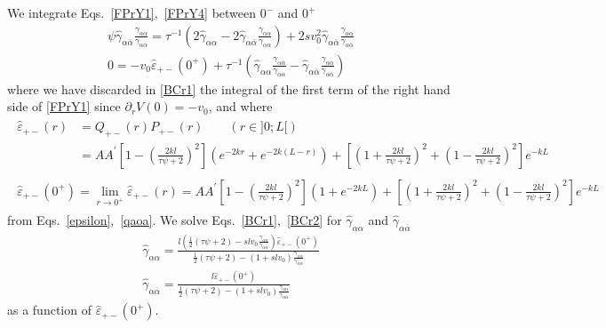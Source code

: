 \documentclass[pre,aps,superscriptaddress,nofootinbib]{revtex4}
\begin{document}
We integrate Eqs.~\ref{FPrY1},~\ref{FPrY4} between $0^-$ and $0^+$
\begin{eqnarray}
\label{BCr1}
\psi \hat{\gamma}_{\alpha\overline{\alpha}} \frac{\gamma_{\alpha\alpha}}{\gamma_{\alpha\overline{\alpha}}} = \tau^{-1} \left(2 \hat{\gamma}_{\alpha\alpha} - 2 \hat{\gamma}_{\alpha\overline{\alpha}} \frac{\gamma_{\alpha\alpha}}{\gamma_{\alpha\overline{\alpha}}}\right) + 2 s v_0^2 \hat{\gamma}_{\alpha\overline{\alpha}} \frac{\gamma_{\alpha\alpha}}{\gamma_{\alpha\overline{\alpha}}}\\
\label{BCr2}
0 = - v_0 \hat{\varepsilon}_{+-}(0^+) + \tau^{-1} \left(\hat{\gamma}_{\alpha\alpha} \frac{\gamma_{\alpha\overline{\alpha}}}{\gamma_{\alpha\alpha}} - \hat{\gamma}_{\alpha\overline{\alpha}} \frac{\gamma_{\alpha\alpha}}{\gamma_{\alpha\overline{\alpha}}}\right)
\end{eqnarray}
where we have discarded in \eqref{BCr1} the integral of the first term of the right hand side of \eqref{FPrY1} since $\partial_r V(0) = -v_0$, and where
\begin{eqnarray}
\label{he+-}
\begin{aligned}
\hat{\varepsilon}_{+-}(r) &= Q_{+-}(r) P_{+-}(r) \qquad (r \in ]0; L[)\\
&= A A^{\prime} \left[1 - \left(\frac{2 k l}{\tau \psi + 2}\right)^2\right](e^{-2 k r} + e^{-2 k (L - r)}) + \left[\left(1 + \frac{2 k l}{\tau \psi + 2}\right)^2 + \left(1 - \frac{2 k l}{\tau \psi + 2}\right)^2\right] e^{-k L}
\end{aligned}\\
\label{he+-lim}
\begin{aligned}
\hat{\varepsilon}_{+-}(0^+) = \lim_{r \to 0^+} \hat{\varepsilon}_{+-}(r) = A A^{\prime} \left[1 - \left(\frac{2 k l}{\tau \psi + 2}\right)^2\right](1 + e^{-2 k L}) + \left[\left(1 + \frac{2 k l}{\tau \psi + 2}\right)^2 + \left(1 - \frac{2 k l}{\tau \psi + 2}\right)^2\right] e^{-k L}
\end{aligned}
\end{eqnarray}
from Eqs.~\ref{epsilon},~\ref{qaoa}. We solve Eqs.~\ref{BCr1},~\ref{BCr2} for $\hat{\gamma}_{\alpha\alpha}$ and $\hat{\gamma}_{\alpha\overline{\alpha}}$
\begin{eqnarray}
\label{hgaa}
\hat{\gamma}_{\alpha\alpha} = \frac{l \left(\frac{1}{2}(\tau \psi + 2) - s l v_0 \frac{\gamma_{\alpha\alpha}}{\gamma_{\alpha\overline{\alpha}}}\right)\hat{\varepsilon}_{+-}(0^+)}{\frac{1}{2}(\tau \psi + 2) - (1 + s l v_0) \frac{\gamma_{\alpha\alpha}}{\gamma_{\alpha\overline{\alpha}}}}\\
\label{hgaoa}
\hat{\gamma}_{\alpha\overline{\alpha}} = \frac{l \hat{\varepsilon}_{+-}(0^+)}{\frac{1}{2}(\tau \psi + 2) - (1 + s l v_0) \frac{\gamma_{\alpha\alpha}}{\gamma_{\alpha\overline{\alpha}}}}
\end{eqnarray}
as a function of $\hat{\varepsilon}_{+-}(0^+)$.\\
\end{document}
